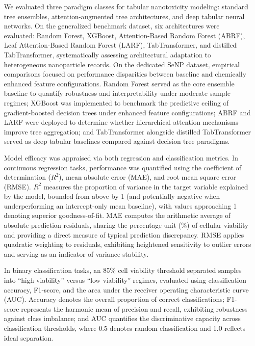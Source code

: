 We evaluated three paradigm classes for tabular nanotoxicity modeling: standard tree ensembles, attention-augmented tree architectures, and deep tabular neural networks. On the generalized benchmark dataset, six architectures were evaluated: Random Forest, XGBoost, Attention-Based Random Forest (ABRF), Leaf Attention-Based Random Forest (LARF), TabTransformer, and distilled TabTransformer, systematically assessing architectural adaptation to heterogeneous nanoparticle records. On the dedicated SeNP dataset, empirical comparisons focused on performance disparities between baseline and chemically enhanced feature configurations. Random Forest served as the core ensemble baseline to quantify robustness and interpretability under moderate sample regimes; XGBoost was implemented to benchmark the predictive ceiling of gradient-boosted decision trees under enhanced feature configurations; ABRF and LARF were deployed to determine whether hierarchical attention mechanisms improve tree aggregation; and TabTransformer alongside distilled TabTransformer served as deep tabular baselines compared against decision tree paradigms.

Model efficacy was appraised via both regression and classification metrics. In continuous regression tasks, performance was quantified using the coefficient of determination ($R^2$), mean absolute error (MAE), and root mean square error (RMSE). $R^2$ measures the proportion of variance in the target variable explained by the model, bounded from above by 1 (and potentially negative when underperforming an intercept-only mean baseline), with values approaching 1 denoting superior goodness-of-fit. MAE computes the arithmetic average of absolute prediction residuals, sharing the percentage unit (\%) of cellular viability and providing a direct measure of typical prediction discrepancy. RMSE applies quadratic weighting to residuals, exhibiting heightened sensitivity to outlier errors and serving as an indicator of variance stability.

In binary classification tasks, an 85\% cell viability threshold separated samples into ``high viability'' versus ``low viability'' regimes, evaluated using classification accuracy, F1-score, and the area under the receiver operating characteristic curve (AUC). Accuracy denotes the overall proportion of correct classifications; F1-score represents the harmonic mean of precision and recall, exhibiting robustness against class imbalance; and AUC quantifies the discriminative capacity across classification thresholds, where 0.5 denotes random classification and 1.0 reflects ideal separation.


